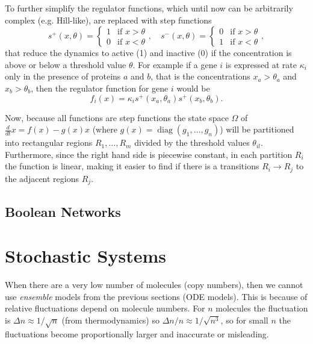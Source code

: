 \documentclass[a4paper]{article}
\theoremstyle{plain}
\theoremstyle{definition}
\theoremstyle{remark}
\begin{document}
To further simplify the regulator functions, which until now can be
arbitrarily complex (e.g. Hill-like), are replaced with step functions
\[
  s^+ (x, \theta) = \begin{cases}
    1 & \text{if } x > \theta \\
    0 & \text{if } x < \theta
  \end{cases},
  \quad
  s^- (x, \theta) = \begin{cases}
    0 & \text{if } x > \theta \\
    1 & \text{if } x < \theta
  \end{cases},
\]
that reduce the dynamics to active (1) and inactive (0) if the concentration
is above or below a threshold value $\theta$. For example if a gene $i$ is
expressed at rate $\kappa_i$ only in the presence of proteins $a$ and $b$,
that is the concentrations $x_a > \theta_a$ and $x_b > \theta_b$, then the
regulator function for gene $i$ would be
\[
  f_i(x) = \kappa_{i} s^+(x_a, \theta_a) s^+(x_b, \theta_b).
\]

Now, because all functions are step functions the state space $\Omega$ of
$\frac{d}{dt} x = f(x) - g(x) x$ (where $g(x) = \operatorname{diag}(g_1,
\ldots, g_n)$) will be partitioned into rectangular regions $R_1, \ldots, R_m$
divided by the threshold values $\theta_{il}$. Furthermore, since the right
hand side is piecewise constant, in each partition $R_i$ the function is
linear, making it easier to find if there is a transitions $R_i \to R_j$ to
the adjacent regions $R_j$.

\subsection{Boolean Networks}


\section{Stochastic Systems}

When there are a very low number of molecules (copy numbers), then we cannot
use \emph{ensemble} models from the previous sections (ODE models). This is
because of relative fluctuations depend on molecule numbers. For $n$ molecules
the fluctuation is $\Delta n \approx 1 / \sqrt{n}$ (from thermodynamics) so
$\Delta n / n \approx 1 / \sqrt{n^3}$, so for small $n$ the fluctuations
become proportionally larger and inaccurate or misleading.
\end{document}
